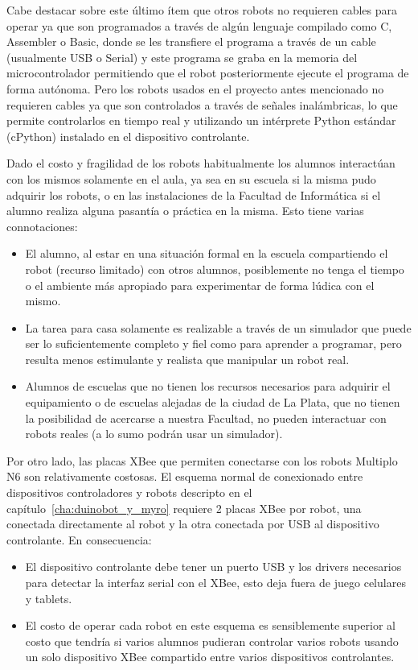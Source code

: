 Cabe destacar sobre este último ítem que otros robots no requieren
cables para operar ya que son programados
a través de algún lenguaje compilado como C, Assembler
o Basic, donde se les transfiere el programa a través de un
cable (usualmente USB o Serial)
y este programa se graba en la memoria del microcontrolador permitiendo
que el robot posteriormente ejecute el programa de forma autónoma.
Pero los robots usados en el proyecto antes mencionado no requieren
cables ya que son controlados a través de señales
inalámbricas, lo que permite controlarlos en tiempo real y utilizando
un intérprete Python estándar (cPython) instalado en el dispositivo
controlante.

Dado el costo y fragilidad de los robots habitualmente los alumnos interactúan
con los mismos solamente en el aula, ya sea en su escuela si la misma pudo
adquirir los robots, o en las instalaciones de la  Facultad de Informática si el alumno
realiza alguna pasantía o práctica en la misma. Esto tiene varias connotaciones:
\begin{itemize}
    \item El alumno, al estar en una situación formal en la escuela
        compartiendo el robot (recurso limitado) con otros
        alumnos, posiblemente no tenga el tiempo o el ambiente más apropiado
        para experimentar de forma lúdica con el mismo.
    \item La tarea para casa solamente es realizable a través de un simulador
        que puede ser lo suficientemente completo y fiel como para aprender
        a programar, pero resulta menos estimulante y realista que manipular
        un robot real.
    \item Alumnos de escuelas que no tienen los recursos necesarios para
        adquirir el equipamiento o de escuelas alejadas de
        la ciudad de La Plata, que
        no tienen la posibilidad de acercarse a nuestra
        Facultad, no pueden interactuar con robots reales
        (a lo sumo podrán usar un simulador).
\end{itemize}

Por otro lado, las placas
XBee que permiten conectarse con los robots Multiplo N6
son relativamente costosas. El esquema normal de conexionado entre dispositivos
controladores y robots descripto en el capítulo~\ref{cha:duinobot_y_myro}
requiere
2 placas XBee por robot, una conectada directamente al robot y la otra
conectada por USB al dispositivo controlante. En consecuencia:
\begin{itemize}
    \item El dispositivo controlante debe tener un puerto USB y los drivers
        necesarios para detectar la interfaz serial con el XBee, esto deja
        fuera de juego celulares y tablets.
    \item El costo de operar cada robot en este esquema es sensiblemente
        superior al costo que tendría si varios alumnos pudieran
        controlar varios robots usando un solo dispositivo XBee compartido
        entre varios dispositivos controlantes.
\end{itemize}

